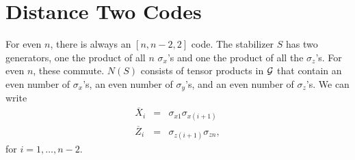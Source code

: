 \documentclass{report}
\newcommand{\G}{{\cal G}}
\newcommand{\X}{\sigma_x}
\newcommand{\Z}{\sigma_z}
\newcommand{\Y}{\sigma_y}
\newcommand{\Xs}[1]{\sigma_{x{#1}}}
\newcommand{\Zs}[1]{\sigma_{z{#1}}}
\newcommand{\Xbar}{\overline{X}}
\newcommand{\Zbar}{\overline{Z}}
\begin{document}
\section{Distance Two Codes}
\label{sec-dist2}

For even $n$, there is always an $[n, n-2, 2]$ code.  The stabilizer $S$ has 
two generators, one the product of all $n$ $\X$'s and one the product of all 
the $\Z$'s.  For even $n$, these commute.  $N(S)$ consists of tensor 
products in $\G$ that contain an even number of $\X$'s, an even number of 
$\Y$'s, and an even number of $\Z$'s.  We can write
\begin{eqnarray}
\Xbar_i & = & \Xs{1} \Xs{(i+1)} \\
\Zbar_i & = & \Zs{(i+1)} \Zs{n},
\end{eqnarray}
for $i = 1, \ldots, n-2$.
\end{document}
